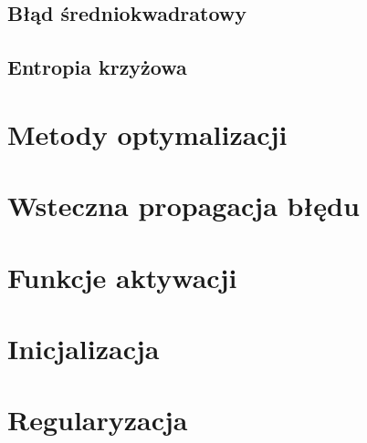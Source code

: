 \documentclass{myclass}
\begin{document}
\subsection{Błąd średniokwadratowy}

\subsection{Entropia krzyżowa}


\section{Metody optymalizacji}
\section{Wsteczna propagacja błędu}
\section{Funkcje aktywacji}
\section{Inicjalizacja}
\section{Regularyzacja}











\end{document}
